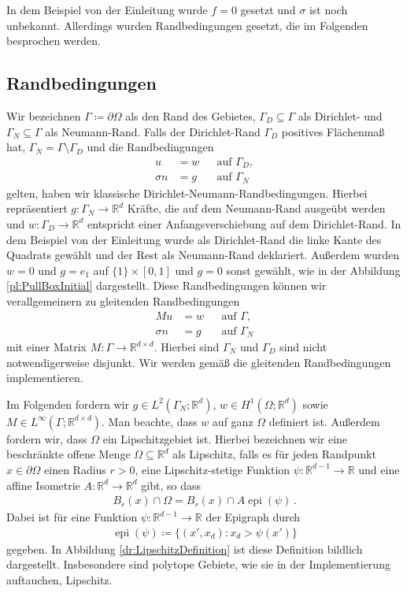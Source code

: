 \documentclass{scrartcl}
\def\R{\mathbb{R}}
\DeclareMathOperator{\epi}{epi}			%
\begin{document}
In dem Beispiel von der Einleitung wurde $f=0$ gesetzt und $\sigma$ ist noch unbekannt. Allerdings wurden Randbedingungen gesetzt, die im Folgenden besprochen werden.

\subsection{Randbedingungen}

Wir bezeichnen $\Gamma\coloneqq \partial\Omega$ als den Rand des Gebietes, $\Gamma_D\subseteq\Gamma$ als Dirichlet- und $\Gamma_N\subseteq\Gamma$ als Neumann-Rand.
Falls der Dirichlet-Rand $\Gamma_D$ positives Flächenmaß hat, $\Gamma_N=\Gamma\setminus\Gamma_D$ und die Randbedingungen
\begin{align*}
	u &= w &&\text{auf }\Gamma_D, \\
	\sigma n&= g &&\text{auf }\Gamma_N
\end{align*}
gelten, haben wir klassische Dirichlet-Neumann-Randbedingungen. Hierbei repräsentiert $g\colon\Gamma_N\to\R^d$ Kräfte, die auf dem Neumann-Rand ausgeübt werden und $w\colon \Gamma_D\to\R^d$ entspricht einer Anfangsverschiebung auf dem Dirichlet-Rand. In dem Beispiel von der Einleitung wurde als Dirichlet-Rand die linke Kante des Quadrats gewählt und der Rest als Neumann-Rand deklariert. Außerdem wurden $w=0$ und $g=e_1$ auf $\{1\}\times[0,1]$ und $g=0$ sonst gewählt, wie in der Abbildung \ref{pl:PullBoxInitial} dargestellt.
Diese Randbedingungen können wir verallgemeinern zu gleitenden Randbedingungen
\begin{align*}
	Mu &= w &&\text{auf }\Gamma, \\
	\sigma n&= g &&\text{auf }\Gamma_N
\end{align*}\label{ch:DefinitionM}%
mit einer Matrix $M\colon\Gamma\to\R^{d\times d}$. Hierbei sind $\Gamma_N$ und $\Gamma_D$ sind nicht notwendigerweise disjunkt. Wir werden gemäß \cite{Alb-2002} die gleitenden Randbedingungen implementieren.

Im Folgenden fordern wir $g\in L^2(\Gamma_N;\R^d)$, $w\in H^1(\Omega;\R^d)$ sowie $M\in L^\infty(\Gamma;\R^{d\times d})$. Man beachte, dass $w$ auf ganz $\Omega$ definiert ist.
Außerdem fordern wir, dass $\Omega$ ein Lipschitz\-gebiet ist.
Hierbei bezeichnen wir eine beschränkte offene Menge $\Omega\subseteq\R^d$ als Lipschitz, falls es für jeden Randpunkt $x\in\partial\Omega$ einen Radius $r>0$, eine Lipschitz-stetige Funktion $\psi\colon\R^{d-1}\to\R$ und eine affine Isometrie $A\colon\R^d\to\R^d$ gibt, so dass
\begin{align}
	B_r(x)\cap\Omega = B_r(x)\cap A\epi(\psi)\,.
	\label{eq:DefinitionLipschitz}
\end{align}
Dabei ist für eine Funktion $\psi\colon\R^{d-1}\to\R$ der Epigraph durch
\begin{align*}
	\epi(\psi)\coloneqq\{(x',x_d)\colon x_d>\psi(x')\}
\end{align*}
gegeben. In Abbildung \ref{dr:LipschitzDefinition} ist diese Definition bildlich dargestellt. Insbesondere sind polytope Gebiete, wie sie in der Implementierung auftauchen, Lipschitz.
\end{document}
